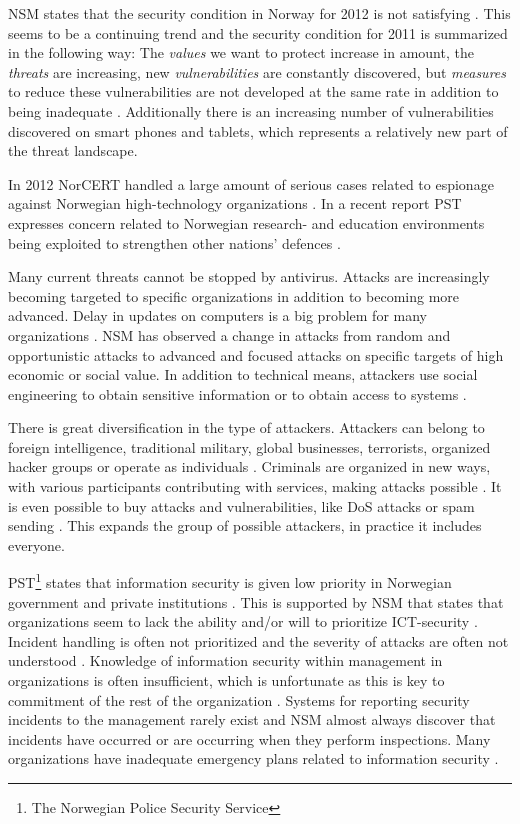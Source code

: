 \acs{NSM} states that the security condition in Norway for 2012 is not satisfying \cite{samordnaVurdering}. This seems to be a continuing trend and the security condition for 2011 is summarized in the following way: The \textit{values} we want to protect increase in amount, the \textit{threats} are increasing, new \textit{vulnerabilities} are constantly discovered, but \textit{measures} to reduce these vulnerabilities are not developed at the same rate in addition to being inadequate \cite{NSMRapport}. Additionally there is an increasing number of vulnerabilities discovered on smart phones and tablets, which represents a relatively new part of the threat landscape.

In 2012 \acs{NorCERT} handled a large amount of serious cases related to espionage against Norwegian high-technology organizations \cite{NorCERT3Kvartal2012}. In a recent report PST expresses concern related to Norwegian research- and education environments being exploited to strengthen other nations' defences \cite{PSTvurdering2013}.   

Many current threats cannot be stopped by antivirus. Attacks are increasingly becoming targeted to specific organizations in addition to becoming more advanced. Delay in updates on computers is a big problem for many organizations \cite{NorCERT2Kvartal2012}. \acs{NSM} has observed a change in attacks from random and opportunistic attacks to advanced and focused attacks on specific targets of high economic or social value. In addition to technical means, attackers use social engineering to obtain sensitive information or to obtain access to systems \cite{NSMRapport}.  

There is great diversification in the type of attackers. Attackers can belong to foreign intelligence, traditional military, global businesses, terrorists, organized hacker groups or operate as individuals \cite{samordnaVurdering}. Criminals are organized in new ways, with various participants contributing with services, making attacks possible \cite{KriposTrender}. It is even possible to buy attacks and vulnerabilities, like \ac{DoS} attacks or spam sending \cite{NorCERT2Kvartal2012}. This expands the group of possible attackers, in practice it includes everyone. 

PST\footnote{The Norwegian Police Security Service} states that information security is given low priority in Norwegian government and private institutions \cite{PSTvurdering}. This is supported by \acs{NSM} that states that organizations seem to lack the ability and/or will to prioritize ICT-security \cite{NSMmelding}. Incident handling is often not prioritized and the severity of attacks are often not understood \cite{NorCERT2Kvartal2012}. Knowledge of information security within management in organizations is often insufficient, which is unfortunate as this is key to commitment of the rest of the organization \cite{NorCERT3Kvartal2012}. Systems for reporting security incidents to the management rarely exist and \acs{NSM} almost always discover that incidents have occurred or are occurring when they perform inspections. Many organizations have inadequate emergency plans related to information security \cite{NSMRapport}.

